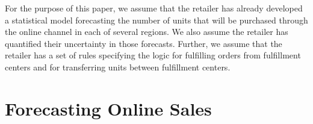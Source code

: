 \documentclass[11pt, oneside]{article}   	%
\begin{document}
For the purpose of this paper, we assume that the retailer has already developed a statistical model forecasting the number of units that will be purchased through the online channel in each of several regions.  We also assume the retailer has quantified their uncertainty in those forecasts.  Further, we assume that the retailer has a set of rules specifying the logic for fulfilling orders from fulfillment centers and for transferring units between fulfillment centers.

\section{Forecasting Online Sales}

\end{document}
